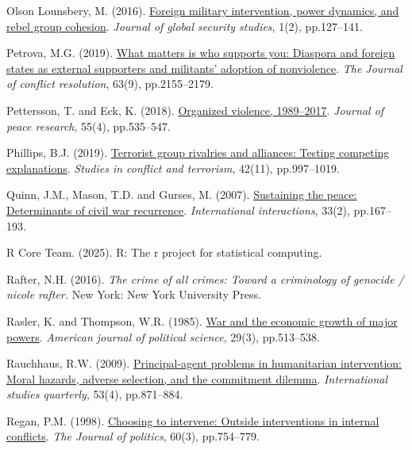 \documentclass[
]{article}
\newlength{\cslhangindent}
\newenvironment{CSLReferences}[2] %
 {\begin{list}{}{%
  \setlength{\itemindent}{0pt}
  \setlength{\leftmargin}{0pt}
  \setlength{\parsep}{0pt}
  \ifodd #1
   \setlength{\leftmargin}{\cslhangindent}
   \setlength{\itemindent}{-1\cslhangindent}
  \fi
  \setlength{\itemsep}{#2\baselineskip}}}
 {\end{list}}
\begin{document}
\begin{CSLReferences}{0}{1}
Olson Lounsbery, M. (2016).
\href{https://doi.org/10.1093/jogss/ogw004}{Foreign military
intervention, power dynamics, and rebel group cohesion}. \emph{Journal
of global security studies}, 1(2), pp.127--141.

Petrova, M.G. (2019).
\href{https://doi.org/10.1177/0022002719826645}{What matters is who
supports you: Diaspora and foreign states as external supporters and
militants' adoption of nonviolence}. \emph{The Journal of conflict
resolution}, 63(9), pp.2155--2179.

Pettersson, T. and Eck, K. (2018).
\href{https://doi.org/10.1177/0022343318784101}{Organized violence,
1989--2017}. \emph{Journal of peace research}, 55(4), pp.535--547.

Phillips, B.J. (2019).
\href{https://doi.org/10.1080/1057610X.2018.1431365}{Terrorist group
rivalries and alliances: Testing competing explanations}. \emph{Studies
in conflict and terrorism}, 42(11), pp.997--1019.

Quinn, J.M., Mason, T.D. and Gurses, M. (2007).
\href{https://doi.org/10.1080/03050620701277673}{Sustaining the peace:
Determinants of civil war recurrence}. \emph{International
interactions}, 33(2), pp.167--193.

R Core Team. (2025). R: The r project for statistical computing.

Rafter, N.H. (2016). \emph{The crime of all crimes: Toward a criminology
of genocide / nicole rafter.} New York: New York University Press.

Rasler, K. and Thompson, W.R. (1985).
\href{https://doi.org/10.2307/2111141}{War and the economic growth of
major powers}. \emph{American journal of political science}, 29(3),
pp.513--538.

Rauchhaus, R.W. (2009).
\href{https://doi.org/10.1111/j.1468-2478.2009.00560.x}{Principal-agent
problems in humanitarian intervention: Moral hazards, adverse selection,
and the commitment dilemma}. \emph{International studies quarterly},
53(4), pp.871--884.

Regan, P.M. (1998). \href{https://doi.org/10.2307/2647647}{Choosing to
intervene: Outside interventions in internal conflicts}. \emph{The
Journal of politics}, 60(3), pp.754--779.


\end{CSLReferences}
\end{document}
